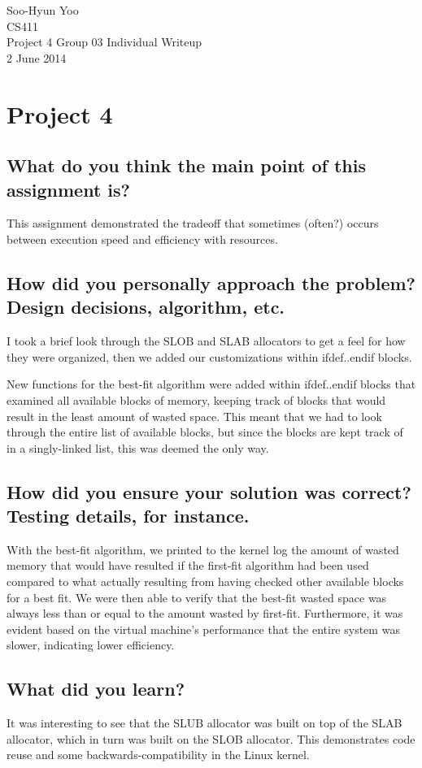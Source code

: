 \documentclass[11pt,letterpaper]{article}
\begin{document}
Soo-Hyun Yoo \\
CS411 \\
Project 4 Group 03 Individual Writeup \\
2 June 2014


\section*{Project 4}

\subsection*{What do you think the main point of this assignment is?}

This assignment demonstrated the tradeoff that sometimes (often?) occurs
between execution speed and efficiency with resources.


\subsection*{How did you personally approach the problem? Design decisions,
algorithm, etc.}

I took a brief look through the SLOB and SLAB allocators to get a feel for how
they were organized, then we added our customizations within ifdef..endif
blocks.

New functions for the best-fit algorithm were added within ifdef..endif blocks
that examined all available blocks of memory, keeping track of blocks that
would result in the least amount of wasted space. This meant that we had to
look through the entire list of available blocks, but since the blocks are kept
track of in a singly-linked list, this was deemed the only way.


\subsection*{How did you ensure your solution was correct? Testing details, for
instance.}

With the best-fit algorithm, we printed to the kernel log the amount of wasted
memory that would have resulted if the first-fit algorithm had been used
compared to what actually resulting from having checked other available blocks
for a best fit. We were then able to verify that the best-fit wasted space was
always less than or equal to the amount wasted by first-fit. Furthermore, it
was evident based on the virtual machine's performance that the entire system
was slower, indicating lower efficiency.


\subsection*{What did you learn?}

It was interesting to see that the SLUB allocator was built on top of the SLAB
allocator, which in turn was built on the SLOB allocator. This demonstrates
code reuse and some backwards-compatibility in the Linux kernel.
\end{document}
